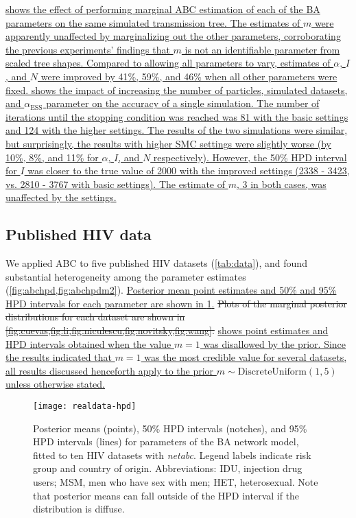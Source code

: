 \documentclass[12pt]{article}\usepackage[]{graphicx}\usepackage[]{color}
\let\mref\cref
\let\Mref\Cref
\renewcommand{\cref}[1]{\mbox{\mref{#1}}}
\renewcommand{\Cref}[1]{\mbox{\Mref{#1}}}
\newcommand{\add}[1]{\color{blue} \uline{#1} \color{black}}
\newcommand{\del}[1]{\color{red} \sout{#1} \color{black}}
\begin{document}
\add{ shows the effect of performing marginal ABC estimation
of each of the BA parameters on the same simulated transmission tree. The
estimates of $m$ were apparently unaffected by marginalizing out the other
parameters, corroborating the previous experiments' findings that $m$ is not an
identifiable parameter from scaled tree shapes. Compared to allowing all
parameters to vary, estimates of $\alpha$, $I$, and $N$ were improved by
    41\%,
    59\%, and
    46\%
when all other parameters were fixed. \Cref{fig:better} shows the impact of
increasing the number of particles, simulated datasets, and
$\alpha_{\text{ESS}}$ parameter on the accuracy of a single simulation. The
number of iterations until the stopping condition was reached was 81 with the
basic settings and 124 with the higher settings. The results of the two
simulations were similar, but surprisingly, the results with higher SMC
settings were slightly worse (by
    10\%,
    8\%, and
    11\%
for $\alpha$, $I$, and $N$ respectively). However, the 50\% HPD interval for
$I$ was closer to the true value of 2000 with the improved settings
    (2338 - 
     3423, vs.
     2810 - 
     3767 with basic settings).
The estimate of $m$, 3 in both cases, was unaffected by the settings.}

\subsection*{Published HIV data}



We applied ABC to five published HIV datasets (\cref{tab:data}),
and found substantial heterogeneity among the parameter estimates
(\cref{fig:abchpd,fig:abchpdm2}). \add{Posterior mean point estimates and 50\%
and 95\% HPD intervals for each parameter are shown in \cref{fig:abchpd}.}
\del{Plots of the marginal posterior distributions for each dataset are shown
in \cref{fig:cuevas,fig:li,fig:niculescu,fig:novitsky,fig:wang}.}
\add{ shows point estimates and HPD intervals obtained when
the value $m = 1$ was disallowed by the prior. Since the results indicated that
$m = 1$ was the most credible value for several datasets, all results discussed
henceforth apply to the prior $m \sim \text{DiscreteUniform}(1, 5)$ unless
otherwise stated.}

\begin{figure}[ht]
    \centering
    \texttt{[image: realdata-hpd]}
    \caption[
        Posterior means and 50\%/95\% HPD intervals for parameters of the
        BA network model, fitted to ten HIV datasets with \textit{netabc}.
    ]{
        Posterior means (points), 50\% HPD intervals (notches), and 95\%
        HPD intervals (lines) for parameters of the BA network model, fitted to
        ten HIV datasets with \textit{netabc}. Legend labels indicate risk
        group and country of origin. Abbreviations: IDU, injection drug users;
        MSM, men who have sex with men; HET, heterosexual. Note that posterior
        means can fall outside of the HPD interval if the distribution is
        diffuse.
    }
    \label{fig:abchpd}
\end{figure}
\end{document}
